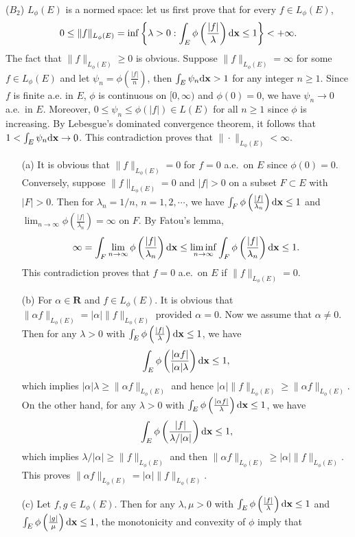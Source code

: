 \begin{exercise}{8.28}
($B_2$) $L_\phi(E)$ is a normed space: let us first prove that for every $f\in L_{\phi}(E)$,  $$0\leq\|f\|_{L_\phi(E)}=\inf\left\{\lambda>0:\int_E\phi\left(\frac{|f|}{\lambda}\right)\mathrm{d}\mathbf{x}\leq1\right\}<+\infty.$$
The fact that $\|f\|_{L_\phi(E)}\geq 0$ is obvious. Suppose $\|f\|_{L_\phi(E)}=\infty$ for some $f\in L_{\phi}(E)$ and let $\psi_n=\phi\left(\frac{|f|}{n}\right)$, then $\int_E\psi_n\mathrm{d}\mathbf{x}>1$ for any integer $n\geq1$. Since $f$ is finite a.e. in $E$, $\phi$ is continuous on $[0,\infty)$ and $\phi(0)=0$, we have $\psi_n\to 0$ a.e.\ in $E$. Moreover, $0\leq \psi_n\leq\phi(|f|)\in L(E)$ for all $n\geq 1$ since $\phi$ is increasing. By Lebesgue's dominated convergence theorem, it follows that $1<\int_E\psi_n\mathrm{d}\mathbf{x}\to 0$. This contradiction proves that $\|\cdot\|_{L_\phi(E)}<\infty$.
\begin{itemize}
    \item[(a)] It is obvious that $\|f\|_{L_\phi(E)}=0$ for $f=0$ a.e.\ on $E$ since $\phi(0)=0$. 
    Conversely, suppose $\|f\|_{L_\phi(E)}=0$ and $|f|>0$ on a subset $F\subset E$ with $|F|>0$. Then for $\lambda_n=1/n$, $n=1,2,\cdots$, we have $\int_F\phi\left(\frac{|f|}{\lambda_n}\right)\mathrm{d}\mathbf{x}\leq 1$ and $\lim_{n\to\infty}\phi\left(\frac{|f|}{\lambda_n}\right)=\infty$ on $F$. By Fatou's lemma, 
    $$\infty=\int_F\lim_{n\to\infty}\phi\left(\frac{|f|}{\lambda_n}\right)\mathrm{d}\mathbf{x}\leq\liminf_{n\to\infty}\int_F\phi\left(\frac{|f|}{\lambda_n}\right)\mathrm{d}\mathbf{x}\leq 1.$$
    This contradiction proves that $f=0$ a.e.\ on $E$ if  $\|f\|_{L_\phi(E)}=0$.
    \item[(b)] For $\alpha\in\mathbf{R}$ and $f\in L_\phi(E)$. It is obvious that $\|\alpha f\|_{L_\phi(E)}=|\alpha|\|f\|_{L_\phi(E)}$ provided $\alpha=0$. Now we assume that $\alpha\neq 0$. Then for any $\lambda>0$ with $\int_E\phi\left(\frac{|f|}{\lambda}\right)\mathrm{d}\mathbf{x}\leq1$, we have
    $$\int_E\phi\left(\frac{|\alpha f|}{|\alpha|\lambda}\right)\mathrm{d}\mathbf{x}\leq1,$$
 which implies $|\alpha|\lambda\geq\|\alpha f\|_{L_\phi(E)}$ and hence $|\alpha|\|f\|_{L_\phi(E)}\geq\|\alpha f\|_{L_\phi(E)}$. On the other hand, for any $\lambda>0$ with $\int_E\phi\left(\frac{|\alpha f|}{\lambda}\right)\mathrm{d}\mathbf{x}\leq1$, we have
 $$\int_E\phi\left(\frac{|f|}{\lambda/|\alpha|}\right)\mathrm{d}\mathbf{x}\leq1,$$
 which implies $\lambda/|\alpha|\geq\|f\|_{L_\phi(E)}$ and then $\|\alpha f\|_{L_\phi(E)}\geq|\alpha|\|f\|_{L_\phi(E)}$. This proves $\|\alpha f\|_{L_\phi(E)}=|\alpha|\|f\|_{L_\phi(E)}$.
    \item[(c)] Let $f,g \in L_\phi(E)$. Then for any $\lambda,\mu>0$ with $\int_E\phi\left(\frac{|f|}{\lambda}\right)\mathrm{d}\mathbf{x}\leq1$ and $\int_E\phi\left(\frac{|g|}{\mu}\right)\mathrm{d}\mathbf{x}\leq1$, the monotonicity and convexity of $\phi$ imply that

\end{itemize}
\end{exercise}
